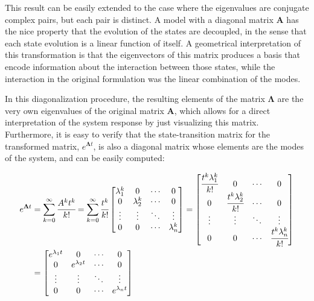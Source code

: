 \documentclass[a4paper,11pt]{book}
\numberwithin{figure}{chapter}
\numberwithin{equation}{chapter}
\numberwithin{table}{chapter}
\theoremstyle{definition}
\begin{document}
This result can be easily extended to the case where the eigenvalues are conjugate complex pairs, but each pair is distinct. A model with a diagonal matrix $\bm{A}$ has the nice property that the evolution of the states are decoupled, in the sense that each state evolution is a linear function of itself. A geometrical interpretation of this transformation is that the eigenvectors of this matrix produces a basis that encode information about the interaction between those states, while the interaction in the original formulation was the linear combination of the modes. 

In this diagonalization procedure, the resulting elements of the matrix $\bm{\Lambda}$ are the very own eigenvalues of the original matrix $\bm{A}$, which allows for a direct interpretation of the system response by just visualizing this matrix. Furthermore, it is easy to verify that the state-transition matrix for the transformed matrix, $e^{\bm{\Lambda} t}$, is also a diagonal matrix whose elements are the modes of the system, and can be easily computed:

\begin{align}
\begin{split}
	e^{\bm{\Lambda} t} & = \sum_{k=0}^{\infty} \cfrac{A^k t^k}{k!	}  = \sum_{k=0}^{\infty} \cfrac{t^k}{k!} \begin{bmatrix} \lambda_1^k & 0 & \cdots & 0 \\ 0 & \lambda_2^k & \cdots & 0 \\ \vdots & \vdots & \ddots & \vdots \\ 0 & 0 & \cdots & \lambda_n^k  \end{bmatrix} = \begin{bmatrix} \cfrac{t^k\lambda_1^k}{k!} & 0 & \cdots & 0 \\ 0 & \cfrac{t^k\lambda_2^k}{k!} & \cdots & 0 \\ \vdots & \vdots & \ddots & \vdots \\ 0 & 0 & \cdots & \cfrac{t^k\lambda_n^k}{k!} \end{bmatrix} \\ 
	&= \begin{bmatrix} e^{\lambda_1 t} & 0 & \cdots & 0 \\ 0 & e^{\lambda_2 t} & \cdots & 0 \\ \vdots & \vdots & \ddots & \vdots \\ 0 & 0 & \cdots & e^{\lambda_n t} \end{bmatrix}
\end{split}
\end{align}
\end{document}
